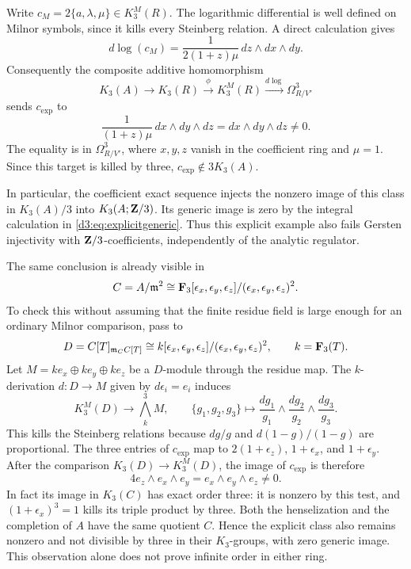 Write $c_M=2\{a,\lambda,\mu\}\in K^M_3(R)$. The logarithmic differential is well defined on Milnor symbols, since it kills every Steinberg relation. A direct calculation gives
\[
d\log(c_M)
=\frac{1}{2(1+z)\mu}\,dz\wedge dx\wedge dy.
\]
Consequently the composite additive homomorphism
\[
K_3(A)\longrightarrow K_3(R)
\xrightarrow{\phi}K^M_3(R)
\xrightarrow{d\log}\Omega^3_{R/V'}
\]
sends $c_{\mathrm{exp}}$ to
\[
\frac{1}{(1+z)\mu}\,dx\wedge dy\wedge dz
=dx\wedge dy\wedge dz\neq0.
\]
The equality is in $\Omega^3_{R/V'}$, where $x,y,z$ vanish in the coefficient ring and $\mu=1$. Since this target is killed by three, $c_{\mathrm{exp}}\notin3K_3(A)$.

In particular, the coefficient exact sequence injects the nonzero image of this class in $K_3(A)/3$ into $K_3(A;\mathbf Z/3)$. Its generic image is zero by the integral calculation in \eqref{d3:eq:explicitgeneric}. Thus this explicit example also fails Gersten injectivity with $\mathbf Z/3$-coefficients, independently of the analytic regulator.

\begin{remark}
The same conclusion is already visible in
\[
C=A/\mathfrak m^2\cong
\mathbf F_3[\epsilon_x,\epsilon_y,\epsilon_z]/(\epsilon_x,\epsilon_y,\epsilon_z)^2.
\]
To check this without assuming that the finite residue field is large enough for an ordinary Milnor comparison, pass to
\[
D=C[T]_{\mathfrak m_C C[T]}
\cong k[\epsilon_x,\epsilon_y,\epsilon_z]/(\epsilon_x,\epsilon_y,\epsilon_z)^2,
\qquad k=\mathbf F_3(T).
\]
Let $M=k e_x\oplus k e_y\oplus k e_z$ be a $D$-module through the residue map. The $k$-derivation $d:D\to M$ given by $d\epsilon_i=e_i$ induces
\[
K_3^M(D)\longrightarrow\bigwedge_k^3 M,\qquad
\{g_1,g_2,g_3\}\longmapsto
\frac{dg_1}{g_1}\wedge\frac{dg_2}{g_2}\wedge\frac{dg_3}{g_3}.
\]
This kills the Steinberg relations because $dg/g$ and $d(1-g)/(1-g)$ are proportional. The three entries of $c_{\mathrm{exp}}$ map to $2(1+\epsilon_z)$, $1+\epsilon_x$, and $1+\epsilon_y$. After the comparison $K_3(D)\to K_3^M(D)$, the image of $c_{\mathrm{exp}}$ is therefore
\[
4e_z\wedge e_x\wedge e_y=e_x\wedge e_y\wedge e_z\ne0.
\]
In fact its image in $K_3(C)$ has exact order three: it is nonzero by this test, and $(1+\epsilon_x)^3=1$ kills its triple product by three. Both the henselization and the completion of $A$ have the same quotient $C$. Hence the explicit class also remains nonzero and not divisible by three in their $K_3$-groups, with zero generic image. This observation alone does not prove infinite order in either ring.
\end{remark}

